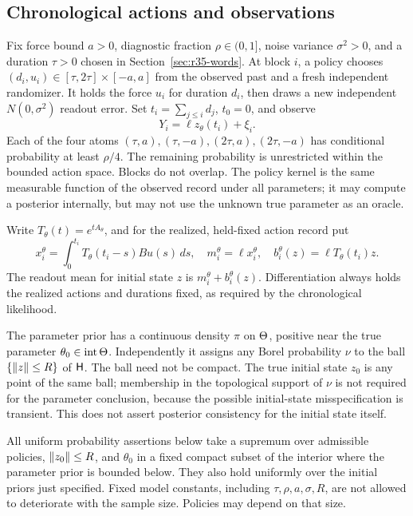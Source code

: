 \subsection{Chronological actions and observations}
Fix force bound $a>0$, diagnostic fraction $\rho\in(0,1]$, noise variance $\sigma^2>0$, and a duration $\tau>0$ chosen in Section~\ref{sec:r35-words}. At block $i$, a policy chooses $(d_i,u_i)\in[\tau,2\tau]\times[-a,a]$ from the observed past and a fresh independent randomizer. It holds the force $u_i$ for duration $d_i$, then draws a new independent $N(0,\sigma^2)$ readout error. Set $t_i=\sum_{j\le i}d_j$, $t_0=0$, and observe
\begin{equation}\label{eq:r35-observations}
 Y_i=\ell z_\theta(t_i)+\xi_i.
\end{equation}
Each of the four atoms $(\tau,a),(\tau,-a),(2\tau,a),(2\tau,-a)$ has conditional probability at least $\rho/4$. The remaining probability is unrestricted within the bounded action space. Blocks do not overlap. The policy kernel is the same measurable function of the observed record under all parameters; it may compute a posterior internally, but may not use the unknown true parameter as an oracle.

Write $T_\theta(t)=e^{tA_\theta}$, and for the realized, held-fixed action record put
\[
 x_i^\theta=\int_0^{t_i}T_\theta(t_i-s)Bu(s)\,ds,\quad
 m_i^\theta=\ell x_i^\theta,\quad b_i^\theta(z)=\ell T_\theta(t_i)z.
\]
The readout mean for initial state $z$ is $m_i^\theta+b_i^\theta(z)$. Differentiation always holds the realized actions and durations fixed, as required by the chronological likelihood.

The parameter prior has a continuous density $\pi$ on $\Theta$, positive near the true parameter $\theta_0\in\operatorname{int}\Theta$. Independently it assigns any Borel probability $\nu$ to the ball $\{\left\|z\right\|\le R\}$ of $\mathsf H$. The ball need not be compact. The true initial state $z_0$ is any point of the same ball; membership in the topological support of $\nu$ is not required for the parameter conclusion, because the possible initial-state misspecification is transient. This does not assert posterior consistency for the initial state itself.

All uniform probability assertions below take a supremum over admissible policies, $\left\|z_0\right\|\le R$, and $\theta_0$ in a fixed compact subset of the interior where the parameter prior is bounded below. They also hold uniformly over the initial priors just specified. Fixed model constants, including $\tau,\rho,a,\sigma,R$, are not allowed to deteriorate with the sample size. Policies may depend on that size.

